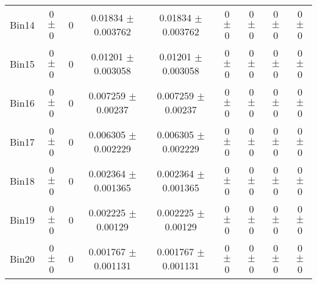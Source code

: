 \begin{tabular}{@{\extracolsep{4pt}}lcccccccc@{}}
     Bin14 & 0 $\pm$ 0 & 0 & 0.01834 $\pm$ 0.003762 & 0.01834 $\pm$ 0.003762 & 0 $\pm$ 0 & 0 $\pm$ 0 & 0 $\pm$ 0 & 0 $\pm$ 0 \\ 
     Bin15 & 0 $\pm$ 0 & 0 & 0.01201 $\pm$ 0.003058 & 0.01201 $\pm$ 0.003058 & 0 $\pm$ 0 & 0 $\pm$ 0 & 0 $\pm$ 0 & 0 $\pm$ 0 \\ 
     Bin16 & 0 $\pm$ 0 & 0 & 0.007259 $\pm$ 0.00237 & 0.007259 $\pm$ 0.00237 & 0 $\pm$ 0 & 0 $\pm$ 0 & 0 $\pm$ 0 & 0 $\pm$ 0 \\ 
     Bin17 & 0 $\pm$ 0 & 0 & 0.006305 $\pm$ 0.002229 & 0.006305 $\pm$ 0.002229 & 0 $\pm$ 0 & 0 $\pm$ 0 & 0 $\pm$ 0 & 0 $\pm$ 0 \\ 
     Bin18 & 0 $\pm$ 0 & 0 & 0.002364 $\pm$ 0.001365 & 0.002364 $\pm$ 0.001365 & 0 $\pm$ 0 & 0 $\pm$ 0 & 0 $\pm$ 0 & 0 $\pm$ 0 \\ 
     Bin19 & 0 $\pm$ 0 & 0 & 0.002225 $\pm$ 0.00129 & 0.002225 $\pm$ 0.00129 & 0 $\pm$ 0 & 0 $\pm$ 0 & 0 $\pm$ 0 & 0 $\pm$ 0 \\ 
     Bin20 & 0 $\pm$ 0 & 0 & 0.001767 $\pm$ 0.001131 & 0.001767 $\pm$ 0.001131 & 0 $\pm$ 0 & 0 $\pm$ 0 & 0 $\pm$ 0 & 0 $\pm$ 0 \\ 
\hline\hline
  \end{tabular}
